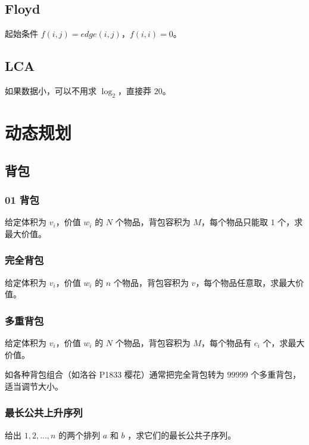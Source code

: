 \documentclass[cn,11pt,black,normal,founder]{elegantbook}
\begin{document}


\section{Floyd}

起始条件 $f(i,j)=edge(i,j)$，$f(i,i)=0$。



\section{LCA}

如果数据小，可以不用求 $\log_2$，直接莽 $20$。




\chapter{动态规划}

\section{背包}

\subsection{01 背包}

给定体积为 $v_i$，价值 $w_i$ 的 $N$ 个物品，背包容积为 $M$，每个物品只能取 $1$ 个，求最大价值。



\subsection{完全背包}

给定体积为 $v_i$，价值 $w_i$ 的 $n$ 个物品，背包容积为 $v$，每个物品任意取，求最大价值。



\subsection{多重背包}

给定体积为 $v_i$，价值 $w_i$ 的 $N$ 个物品，背包容积为 $M$，每个物品有 $c_i$ 个，求最大价值。

如各种背包组合（如洛谷 P1833 樱花）通常把完全背包转为 $99999$ 个多重背包，适当调节大小。



\subsection{最长公共上升序列}

给出 $1,2,\ldots,n$ 的两个排列 $a$ 和 $b$ ，求它们的最长公共子序列。


\end{document}
